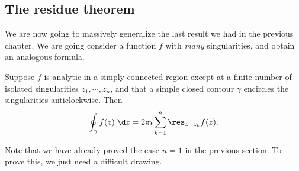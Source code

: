 \documentclass[a4paper]{article}
\begin{document}
\subsection{The residue theorem}
We are now going to massively generalize the last result we had in the previous chapter. We are going consider a function $f$ with \emph{many} singularities, and obtain an analogous formula.

\begin{thm}
  Suppose $f$ is analytic in a simply-connected region except at a finite number of isolated singularities $z_1, \cdots, z_n$, and that a simple closed contour $\gamma$ encircles the singularities anticlockwise. Then
  \[
    \oint_\gamma f(z)\;\d z = 2\pi i \sum_{k = 1}^n \res_{z = z_k} f(z).
  \]
\end{thm}
\begin{center}
\end{center}
Note that we have already proved the case $n = 1$ in the previous section. To prove this, we just need a difficult drawing.
\end{document}
